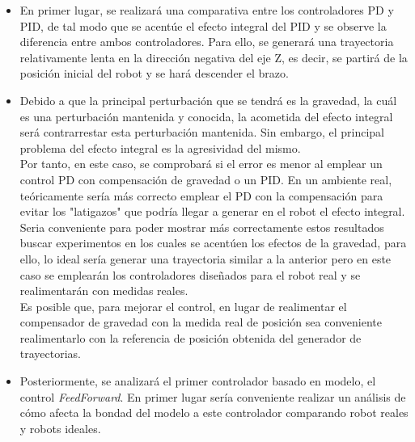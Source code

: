 \begin{itemize}
	
	\item En primer lugar, se realizará una comparativa entre los controladores PD y PID, de tal modo que se acentúe el efecto integral del PID y se observe la diferencia entre ambos controladores. Para ello, se generará una trayectoria relativamente lenta en la dirección negativa del eje Z, es decir, se partirá de la posición inicial del robot y se hará descender el brazo. \\
	
	
	
	\item Debido a que la principal perturbación que se tendrá es la gravedad, la cuál es una perturbación mantenida y conocida, la acometida del efecto integral será contrarrestar esta perturbación mantenida. Sin embargo, el principal problema del efecto integral es la agresividad del mismo. \\
	
	Por tanto, en este caso, se comprobará si el error es menor al emplear un control PD con compensación de gravedad o un PID. En un ambiente real, teóricamente sería más correcto emplear el PD con la compensación para evitar los "latigazos" que podría llegar a generar en el robot el efecto integral.\\
	
	Seria conveniente para poder mostrar más correctamente estos resultados buscar experimentos en los cuales se acentúen los efectos de la gravedad, para ello, lo ideal sería generar una trayectoria similar a la anterior pero en este caso se emplearán los controladores diseñados para el robot real y se realimentarán con medidas reales. \\
	
	Es posible que, para mejorar el control, en lugar de realimentar el compensador de gravedad con la medida real de posición sea conveniente realimentarlo con la referencia de posición obtenida del generador de trayectorias. \\
	
	
	
	\item Posteriormente, se analizará el primer controlador basado en modelo, el control \textit{FeedForward}. En primer lugar sería conveniente realizar un análisis de cómo afecta la bondad del modelo a este controlador comparando robot reales y robots ideales. \\
	

\end{itemize}
